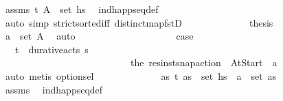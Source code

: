 \begin{isabellebody}
\ assms\ {\isacartoucheopen}{\isacharparenleft}{\kern0pt}t{\isacharcomma}{\kern0pt}\ A{\isacharprime}{\kern0pt}{\isacharparenright}{\kern0pt}\ {\isasymin}\ set\ hs{\isacartoucheclose}\ \isamarkupfalse%
\ ind{\isacharunderscore}{\kern0pt}happ{\isacharunderscore}{\kern0pt}seq{\isacharunderscore}{\kern0pt}def\isanewline
\ \ \ \ \ \ \ \ \ \ \ \ \isamarkupfalse%
\ {\isacharparenleft}{\kern0pt}auto\ simp{\isacharcolon}{\kern0pt}\ strict{\isacharunderscore}{\kern0pt}sorted{\isacharunderscore}{\kern0pt}iff\ distinct{\isacharunderscore}{\kern0pt}map{\isacharunderscore}{\kern0pt}fstD{\isacharparenright}{\kern0pt}\isanewline
\ \ \ \ \ \ \ \ \ \ \isamarkupfalse%
\ \isamarkupfalse%
\ {\isacharquery}{\kern0pt}thesis\isanewline
\ \ \ \ \ \ \ \ \ \ \ \ \isamarkupfalse%
\ {\isacartoucheopen}a\ {\isasymin}\ set\ A{\isacharprime}{\kern0pt}{\isacartoucheclose}\ \isamarkupfalse%
\ auto\isanewline
\ \ \ \ \ \ \ \ \isamarkupfalse%
\isanewline
\ \ \ \ \ \ \ \ \ \ \isamarkupfalse%
\ {\isacharquery}{\kern0pt}case{}\isanewline
\ \ \ \ \ \ \ \ \ \ \isamarkupfalse%
\ \isamarkupfalse%
\ {\isasympi}\ \ {\isachardoublequoteopen}{\isacharparenleft}{\kern0pt}t{\isacharcomma}{\kern0pt}{\isasympi}{\isacharparenright}{\kern0pt}\ {\isasymin}\ durative{\isacharunderscore}{\kern0pt}acts\ {\isasympi}s{\isachardoublequoteclose}\ \isanewline
\ \ \ \ \ \ \ \ \ \ \ \ \ \ \ \ \ \ \ \ \ \ \ \ \ \ \ {\isachardoublequoteopen}the\ {\isacharparenleft}{\kern0pt}res{\isacharunderscore}{\kern0pt}inst{\isacharunderscore}{\kern0pt}snap{\isacharunderscore}{\kern0pt}action\ {\isasympi}\ At{\isacharunderscore}{\kern0pt}Start{\isacharparenright}{\kern0pt}\ {\isacharequal}{\kern0pt}\ a{\isachardoublequoteclose}\isanewline
\ \ \ \ \ \ \ \ \ \ \ \ \isamarkupfalse%
\ auto\ {\isacharparenleft}{\kern0pt}metis\ option{\isachardot}{\kern0pt}sel{\isacharparenright}{\kern0pt}\isanewline
\ \ \ \ \ \ \ \ \ \ \isamarkupfalse%
\ \isamarkupfalse%
\ {\isachardoublequoteopen}{\isasymexists}as{\isachardot}{\kern0pt}\ {\isacharparenleft}{\kern0pt}t{\isacharcomma}{\kern0pt}\ as{\isacharparenright}{\kern0pt}\ {\isasymin}\ set\ hs\ {\isasymand}\ a\ {\isasymin}\ set\ as{\isachardoublequoteclose}\isanewline
\ \ \ \ \ \ \ \ \ \ \ \ \isamarkupfalse%
\ assms\ \isamarkupfalse%
\ ind{\isacharunderscore}{\kern0pt}happ{\isacharunderscore}{\kern0pt}seq{\isacharunderscore}{\kern0pt}def\ \isamarkupfalse%

\end{isabellebody}
